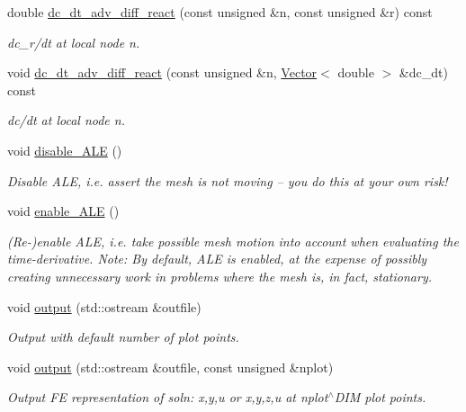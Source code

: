 \begin{DoxyCompactItemize}
double \hyperlink{classoomph_1_1AdvectionDiffusionReactionEquations_adf47eb6be16a1d42bdb4019fde6f4b82}{dc\+\_\+dt\+\_\+adv\+\_\+diff\+\_\+react} (const unsigned \&n, const unsigned \&r) const
\begin{DoxyCompactList}\small\item\em dc\+\_\+r/dt at local node n. \end{DoxyCompactList}\item 
void \hyperlink{classoomph_1_1AdvectionDiffusionReactionEquations_a39154d834bca6581eab17920e8b4e20a}{dc\+\_\+dt\+\_\+adv\+\_\+diff\+\_\+react} (const unsigned \&n, \hyperlink{classoomph_1_1Vector}{Vector}$<$ double $>$ \&dc\+\_\+dt) const
\begin{DoxyCompactList}\small\item\em dc/dt at local node n. \end{DoxyCompactList}\item 
void \hyperlink{classoomph_1_1AdvectionDiffusionReactionEquations_abe712696eb8db1c8b4f2eb5103a54c3f}{disable\+\_\+\+A\+LE} ()
\begin{DoxyCompactList}\small\item\em Disable A\+LE, i.\+e. assert the mesh is not moving -- you do this at your own risk! \end{DoxyCompactList}\item 
void \hyperlink{classoomph_1_1AdvectionDiffusionReactionEquations_a8c90c9aa40fbe311742b18a2c979730a}{enable\+\_\+\+A\+LE} ()
\begin{DoxyCompactList}\small\item\em (Re-\/)enable A\+LE, i.\+e. take possible mesh motion into account when evaluating the time-\/derivative. Note\+: By default, A\+LE is enabled, at the expense of possibly creating unnecessary work in problems where the mesh is, in fact, stationary. \end{DoxyCompactList}\item 
void \hyperlink{classoomph_1_1AdvectionDiffusionReactionEquations_a70be6733b56f27104a4a849c296b5b62}{output} (std\+::ostream \&outfile)
\begin{DoxyCompactList}\small\item\em Output with default number of plot points. \end{DoxyCompactList}\item 
void \hyperlink{classoomph_1_1AdvectionDiffusionReactionEquations_a38aa99ed50cc082f0c9c7079a13a11da}{output} (std\+::ostream \&outfile, const unsigned \&nplot)
\begin{DoxyCompactList}\small\item\em Output FE representation of soln\+: x,y,u or x,y,z,u at nplot$^\wedge$\+D\+IM plot points. \end{DoxyCompactList}\item 

\end{DoxyCompactItemize}
